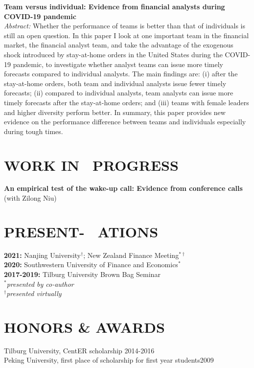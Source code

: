 \documentclass[margin]{res}
\begin{document}
\begin{resume}
\vspace{0.9em}

\textbf{Team versus individual: Evidence from financial analysts during COVID-19 pandemic} \\  
\textit{Abstract:} Whether the performance of teams is better than that of individuals is still an open question. In this paper I look at one important team in the financial market, the financial analyst team, and take the advantage of the exogenous shock introduced by stay-at-home orders in the United States during the COVID-19 pandemic, to investigate whether analyst teams can issue more timely forecasts compared to individual analysts. The main findings are: (i) after the stay-at-home orders, both team and individual analysts issue fewer timely forecasts; (ii) compared to individual analysts, team analysts can issue more timely forecasts after the stay-at-home orders; and (iii) teams with female leaders and higher diversity perform better. In summary, this paper provides new evidence on the performance difference between teams and individuals especially during tough times.

\section{\textbf{WORK IN \ PROGRESS}} 
\textbf{An empirical test of the wake-up call: Evidence from conference calls
} (with Zilong Niu)\\


\section{\textbf{PRESENT- \ ATIONS}}
\textbf{2021:} Nanjing University$^{\dagger}$; New Zealand Finance Meeting$^{\ast\dagger}$ \\
\textbf{2020:} Southwestern University of Finance and Economics$^{\ast}$  \\
\textbf{2017-2019:} Tilburg University Brown Bag Seminar\\
\textit{$^{\ast}$presented by co-author} \\
\textit{$^{\dagger}$presented virtually}

 

\section{\textbf{HONORS \& AWARDS}}
Tilburg University, CentER scholarship 				\hfill 2014-2016	\\
Peking University, first place of scholarship for first year students\hfill 2009


\end{resume}
\end{document}
